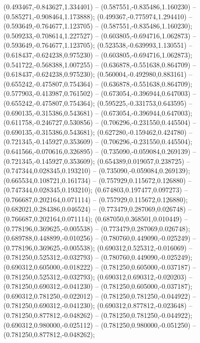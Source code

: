  (0.493467,-0.843627,1.334401) -- (0.587551,-0.835486,1.160230) -- (0.585271,-0.908464,1.173888);
 (0.499367,-0.775974,1.294410) -- (0.593649,-0.764677,1.123705) -- (0.587551,-0.835486,1.160230);
 (0.509233,-0.708614,1.227527) -- (0.603805,-0.694716,1.062873) -- (0.593649,-0.764677,1.123705);
 (0.523538,-0.639993,1.130551) -- (0.618437,-0.624238,0.975230) -- (0.603805,-0.694716,1.062873);
 (0.541722,-0.568388,1.007255) -- (0.636878,-0.551638,0.864709) -- (0.618437,-0.624238,0.975230);
 (0.560004,-0.492980,0.883161) -- (0.655242,-0.475807,0.754364) -- (0.636878,-0.551638,0.864709);
 (0.577903,-0.413987,0.761502) -- (0.673054,-0.396944,0.647003) -- (0.655242,-0.475807,0.754364);
 (0.595225,-0.331753,0.643595) -- (0.690135,-0.315386,0.543681) -- (0.673054,-0.396944,0.647003);
 (0.611758,-0.246727,0.530856) -- (0.706296,-0.231550,0.445504) -- (0.690135,-0.315386,0.543681);
 (0.627280,-0.159462,0.424780) -- (0.721345,-0.145927,0.353609) -- (0.706296,-0.231550,0.445504);
 (0.641566,-0.070616,0.326895) -- (0.735090,-0.059084,0.269139) -- (0.721345,-0.145927,0.353609);
 (0.654389,0.019057,0.238725) -- (0.747344,0.028345,0.193210) -- (0.735090,-0.059084,0.269139);
 (0.665534,0.108721,0.161734) -- (0.757929,0.115672,0.126880) -- (0.747344,0.028345,0.193210);
 (0.674803,0.197477,0.097273) -- (0.766687,0.202164,0.071114) -- (0.757929,0.115672,0.126880);
 (0.682021,0.284386,0.046524) -- (0.773479,0.287069,0.026748) -- (0.766687,0.202164,0.071114);
 (0.687050,0.368501,0.010449) -- (0.778196,0.369625,-0.005538) -- (0.773479,0.287069,0.026748);
 (0.689788,0.448899,-0.010256) -- (0.780760,0.449090,-0.025249) -- (0.778196,0.369625,-0.005538);
 (0.690312,0.525312,-0.016069) -- (0.781250,0.525312,-0.032793) -- (0.780760,0.449090,-0.025249);
 (0.690312,0.605000,-0.018222) -- (0.781250,0.605000,-0.037187) -- (0.781250,0.525312,-0.032793);
 (0.690312,0.690312,-0.020203) -- (0.781250,0.690312,-0.041230) -- (0.781250,0.605000,-0.037187);
 (0.690312,0.781250,-0.022012) -- (0.781250,0.781250,-0.044922) -- (0.781250,0.690312,-0.041230);
 (0.690312,0.877812,-0.023648) -- (0.781250,0.877812,-0.048262) -- (0.781250,0.781250,-0.044922);
 (0.690312,0.980000,-0.025112) -- (0.781250,0.980000,-0.051250) -- (0.781250,0.877812,-0.048262);
